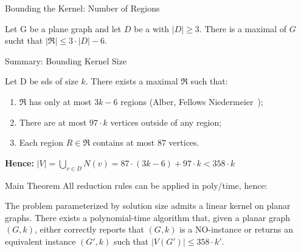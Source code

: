 \begin{frame}[c]{Bounding the Kernel: Number of Regions}

    \begin{figure}[!ht]

    \end{figure}
    \pause\begin{tcolorbox}[colback=TUMBlueLighter,title=Number of Regions~\cite{Alber2004}]
        Let G be a plane graph and let $D$ be a \sdom with $|D| \geq 3$. There is a maximal \dreg of $G$ sucht that $|\mathfrak{R}| \leq 3 \cdot |D|- 6$.
    \end{tcolorbox}

\end{frame}

\begin{frame}[c]{Summary: Bounding Kernel Size}

    Let D be sds of size $k$. There exists a maximal \dreg $\mathfrak{R}$ such that:

    \begin{enumerate}
        \item $\mathfrak{R}$ has only at most $3 k - 6$ regions  (Alber, Fellows Niedermeier~\cite{Alber2004});
        \item There are at most $97 \cdot k$ vertices outside of any region;
        \item Each region  $R \in \mathfrak{R}$ contains at most $87$ vertices.
    \end{enumerate}

    \textbf{Hence: } $|V| = \bigcup_{v \in D} N(v) = 87 \cdot (3k - 6) + 97 \cdot k  < 358 \cdot k$

\end{frame}

\begin{frame}[c]{Main Theorem}
    All reduction rules can be applied in poly/time, hence:

\begin{tcolorbox}[colback=TUMBlueLighter,title=The Main Theorem]
    The \sdom problem parameterized by solution size admits a linear kernel on planar graphs.
    There exists a polynomial-time algorithm that, given a planar graph $(G, k)$, either correctly reports that $(G, k)$ is a NO-instance or returns an equivalent instance $(G', k)$ such that $|V(G')| \leq 358 \cdot k'$.
\end{tcolorbox}
\end{frame}

